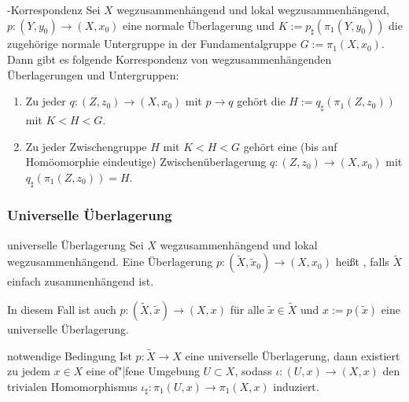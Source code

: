 \begin{Satz}{-Korrespondenz}
    Sei $X$ wegzusammenhängend und lokal wegzusammenhängend,
    $p\colon (Y, y_0) \rightarrow (X, x_0)$ eine normale Überlagerung und
    $K := p_\sharp(\pi_1(Y, y_0))$ die zugehörige normale Untergruppe in der
    Fundamentalgruppe $G := \pi_1(X, x_0)$.
    Dann gibt es folgende Korrespondenz von wegzusammenhängenden Überlagerungen
    und Untergruppen:
    \begin{enumerate}
        \item
        Zu jeder 
        $q\colon (Z, z_0) \rightarrow (X, x_0)$ mit
        $p \rightarrow q$ gehört die 
        $H := q_\sharp(\pi_1(Z, z_0))$ mit $K < H < G$.

        \item
        Zu jeder Zwischengruppe $H$ mit $K < H < G$ gehört eine
        (bis auf Homöomorphie eindeutige) Zwischenüberlagerung
        $q\colon (Z, z_0) \rightarrow (X, x_0)$ mit
        $q_\sharp(\pi_1(Z, z_0)) = H$.
    \end{enumerate}
\end{Satz}

\pagebreak

\subsubsection{%
    Universelle Überlagerung%
}

\begin{Def}{universelle Überlagerung}
    Sei $X$ wegzusammenhängend und lokal wegzusammenhängend.
    Eine Überlagerung
    $p\colon (\widetilde{X}, \widetilde{x}_0) \rightarrow (X, x_0)$ heißt
    , falls $\widetilde{X}$ einfach zusammenhängend ist.
\end{Def}

\begin{Bem}
    In diesem Fall ist auch
    $p\colon (\widetilde{X}, \widetilde{x}) \rightarrow (X, x)$ für alle
    $\widetilde{x} \in \widetilde{X}$ und $x := p(\widetilde{x})$ eine
    universelle Überlagerung.
\end{Bem}

\linie

\begin{Satz}{notwendige Bedingung}
    Ist $p\colon \widetilde{X} \rightarrow X$ eine universelle Überlagerung,
    dann existiert zu jedem $x \in X$ eine of"|fene Umgebung $U \subset X$,
    sodass $\iota\colon (U, x) \rightarrow (X, x)$ den trivialen Homomorphismus
    $\iota_\sharp\colon \pi_1(U, x) \rightarrow \pi_1(X, x)$ induziert.
\end{Satz}


